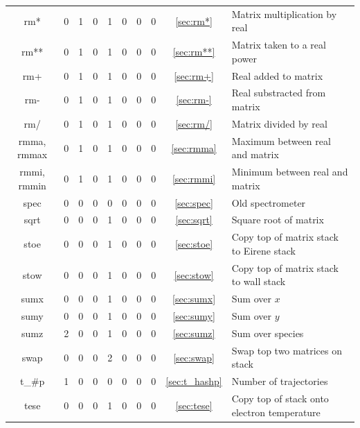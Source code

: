 \documentclass[a4paper,10pt]{report}
\begin{document}
\begin{center}
\begin{longtable}{|c|c|c|c|c|c|c|c|c|l|}
    rm* \index{b2plot, rm*}        & 0 & 1 & 0 & 1 & 0 & 0 & 0 & \ref{sec:rm*}   & Matrix multiplication by real \\
    rm** \index{b2plot, rm**}      & 0 & 1 & 0 & 1 & 0 & 0 & 0 & \ref{sec:rm**}  & Matrix taken to a real power \\
    rm+ \index{b2plot, rm+}        & 0 & 1 & 0 & 1 & 0 & 0 & 0 & \ref{sec:rm+}   & Real added to matrix \\
    rm- \index{b2plot, rm-}        & 0 & 1 & 0 & 1 & 0 & 0 & 0 & \ref{sec:rm-}   & Real substracted from matrix \\
    rm/ \index{b2plot, rm/}        & 0 & 1 & 0 & 1 & 0 & 0 & 0 & \ref{sec:rm/}   & Matrix divided by real \\
    rmma, rmmax \index{b2plot, rmma}\index{b2plot, rmmax}        & 0 & 1 & 0 & 1 & 0 & 0 & 0 & \ref{sec:rmma}  & Maximum between real and matrix \\
    rmmi, rmmin \index{b2plot, rmmi}\index{b2plot, rmmin}         & 0 & 1 & 0 & 1 & 0 & 0 & 0 & \ref{sec:rmmi}  & Minimum between real and matrix \\
    spec \index{b2plot, spec}      & 0 & 0 & 0 & 0 & 0 & 0 & 0 & \ref{sec:spec}  & Old spectrometer \\
    sqrt \index{b2plot, sqrt}      & 0 & 0 & 0 & 1 & 0 & 0 & 0 & \ref{sec:sqrt}  & Square root of matrix \\
    stoe \index{b2plot, stoe}      & 0 & 0 & 0 & 1 & 0 & 0 & 0 & \ref{sec:stoe}  & Copy top of matrix stack to Eirene stack \\
    stow \index{b2plot, stow}      & 0 & 0 & 0 & 1 & 0 & 0 & 0 & \ref{sec:stow}  & Copy top of matrix stack to wall stack \\
    sumx \index{b2plot, sumx}      & 0 & 0 & 0 & 1 & 0 & 0 & 0 & \ref{sec:sumx}  & Sum over $x$ \\
    sumy \index{b2plot, sumy}      & 0 & 0 & 0 & 1 & 0 & 0 & 0 & \ref{sec:sumy}  & Sum over $y$ \\
    sumz \index{b2plot, sumz}      & 2 & 0 & 0 & 1 & 0 & 0 & 0 & \ref{sec:sumz}  & Sum over species \\
    swap \index{b2plot, swap}      & 0 & 0 & 0 & 2 & 0 & 0 & 0 & \ref{sec:swap}  & Swap top two matrices on stack \\
    t\_\#p \index{b2plot, t\_\#p}  & 1 & 0 & 0 & 0 & 0 & 0 & 0 & \ref{sec:t_hashp} & Number of trajectories \\
    tese \index{b2plot, tese}      & 0 & 0 & 0 & 1 & 0 & 0 & 0 & \ref{sec:tese}  & Copy top of stack onto electron temperature \\

\end{longtable}
\end{center}
\end{document}
